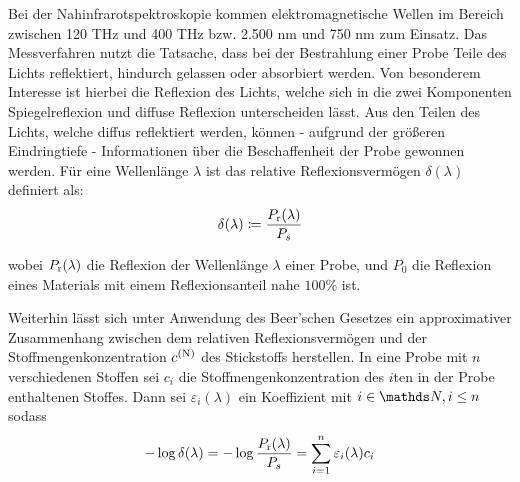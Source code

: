 		Bei der Nahinfrarotspektroskopie kommen elektromagnetische Wellen im Bereich zwischen 120 THz und 400 THz bzw. 2.500 nm und 750 nm zum Einsatz.\cite{Agelet2010}
		Das Messverfahren nutzt die Tatsache, dass bei der Bestrahlung einer Probe Teile des Lichts reflektiert, hindurch gelassen oder absorbiert werden.
		Von besonderem Interesse ist hierbei die Reflexion des Lichts, welche sich in die zwei Komponenten \glqq Spiegelreflexion\grqq{} und \glqq diffuse Reflexion\grqq{} unterscheiden lässt.
		Aus den Teilen des Lichts, welche diffus reflektiert werden, können - aufgrund der größeren Eindringtiefe - Informationen über die Beschaffenheit der Probe gewonnen werden.\cite{Agelet2010}
		Für eine Wellenlänge $\lambda$ ist das relative Reflexionsvermögen $\delta(\lambda)$ definiert als:
		\[
			\delta(\lambda) \coloneqq \frac{P_{\mathrm{r}}(\lambda)}{P_s}
		\]

		wobei $P_{\mathrm{r}}(\lambda)$ die Reflexion der Wellenlänge $\lambda$ einer Probe, und $P_0$ die Reflexion eines Materials mit einem Reflexionsanteil nahe $100\%$ ist.

		Weiterhin lässt sich unter Anwendung des Beer'schen Gesetzes ein approximativer Zusammenhang zwischen dem relativen Reflexionsvermögen und der Stoffmengenkonzentration $c^{\mathrm{(N)}}$ des Stickstoffs herstellen.
		In eine Probe mit $n$ verschiedenen Stoffen sei $c_i$ die Stoffmengenkonzentration des $i$ten in der Probe enthaltenen Stoffes.
		Dann sei $\varepsilon_i(\lambda)$ ein Koeffizient mit $i\in\SN,i\leq n$ sodass
		\[
			-\log \delta(\lambda) = -\log \frac{P_{\mathrm{r}}(\lambda)}{P_s} = \sum_{i=1}^{n} \varepsilon_i(\lambda) c_i
		\]



